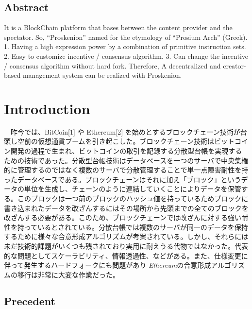 \hypertarget{abstract}{%
\subsection{Abstract}\label{abstract}}

It is a BlockChain platform that bases between the content provider and
the spectator. So, ``Proskenion'' named for the etymology of ``Prosium
Arch'' (Greek). 1. Having a high expression power by a combination of
primitive instruction sets. 2. Easy to customize incentive / consensus
algorithm. 3. Can change the incentive / consensus algorithm without
hard fork. Therefore, A decentralized and creator-based management
system can be realized with Proskenion.

\hypertarget{introduction}{%
\section{Introduction}\label{introduction}}

　昨今では、BitCoin{[}1{]} や Ethereum{[}2{]}
を始めとするブロックチェーン技術が台頭し空前の仮想通貨ブームを引き起こした。ブロックチェーン技術はビットコイン開発の過程で生まれ、ビットコインの取引を記録する分散型台帳を実現するための技術であった。分散型台帳技術はデータベースを一つのサーバで中央集権的に管理するのではなく複数のサーバで分散管理することで単一点障害耐性を持ったデータベースである。ブロックチェーンはそれに加え「ブロック」というデータの単位を生成し、チェーンのように連結していくことによりデータを保管する。このブロックは一つ前のブロックのハッシュ値を持っているためブロックに書き込まれたデータを改ざんするにはその場所から先頭までの全てのブロックを改ざんする必要がある。このため、ブロックチェーンでは改ざんに対する強い耐性を持っているとされている。分散台帳では複数のサーバが同一のデータを保持するために様々な合意形成アルゴリズムが考案されている。しかし、それらには未だ技術的課題がいくつも残されており実用に耐えうる代物ではなかった。代表的な問題としてスケーラビリティ、情報透過性、などがある。また、仕様変更に伴って発生するハードフォークにも問題があり
\emph{Ethereum}の合意形成アルゴリズムの移行は非常に大変な作業だった。

\hypertarget{precedent}{%
\subsection{Precedent}\label{precedent}}

